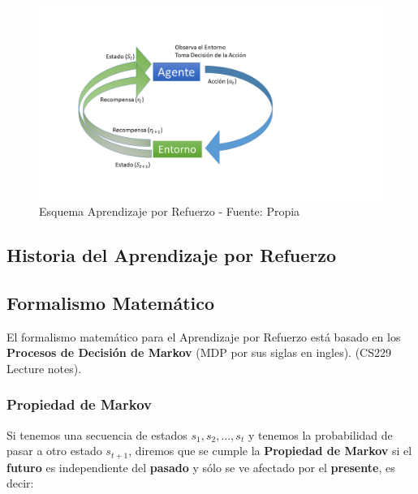 \documentclass[
  a4paper,
  DIV=11,
  numbers=noendperiod]{scrreprt}
\begin{document}
\begin{figure}

{\centering \includegraphics[width=1\textwidth,height=\textheight]{imagenes/reinforcement_learning/rl-diagrama.png}

}

\caption{Esquema Aprendizaje por Refuerzo - Fuente: Propia}

\end{figure}

\hypertarget{historia-del-aprendizaje-por-refuerzo}{%
\subsection{Historia del Aprendizaje por
Refuerzo}\label{historia-del-aprendizaje-por-refuerzo}}

\hypertarget{formalismo-matemuxe1tico}{%
\subsection{Formalismo Matemático}\label{formalismo-matemuxe1tico}}

El formalismo matemático para el Aprendizaje por Refuerzo está basado en
los \textbf{Procesos de Decisión de Markov} (MDP por sus siglas en
ingles). (CS229 Lecture notes).

\hypertarget{propiedad-de-markov}{%
\subsubsection{Propiedad de Markov}\label{propiedad-de-markov}}

Si tenemos una secuencia de estados \(s_1, s_2, ..., s_t\) y tenemos la
probabilidad de pasar a otro estado \(s_{t+1}\), diremos que se cumple
la \textbf{Propiedad de Markov} si el \textbf{futuro} es independiente
del \textbf{pasado} y sólo se ve afectado por el \textbf{presente}, es
decir:
\end{document}
